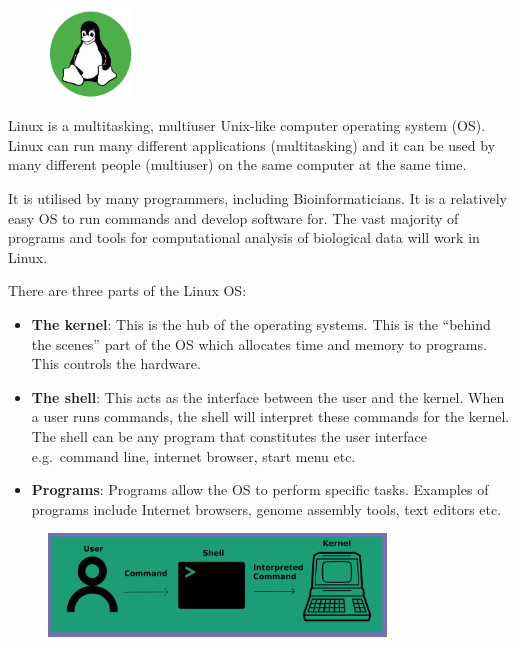 \documentclass[
  letterpaper,
  DIV=11,
  numbers=noendperiod]{scrreprt}
\providecommand{\tightlist}{%
  \setlength{\itemsep}{0pt}\setlength{\parskip}{0pt}}\usepackage{longtable,booktabs,array}
\begin{document}
\begin{figure}

{\centering \includegraphics[width=0.2\textwidth,height=\textheight]{figures/linux_beginner.png}

}

\end{figure}

Linux is a multitasking, multiuser Unix-like computer operating system
(OS). Linux can run many different applications (multitasking) and it
can be used by many different people (multiuser) on the same computer at
the same time.

It is utilised by many programmers, including Bioinformaticians. It is a
relatively easy OS to run commands and develop software for. The vast
majority of programs and tools for computational analysis of biological
data will work in Linux.

There are three parts of the Linux OS:

\begin{itemize}
\tightlist
\item
  \textbf{The kernel}: This is the hub of the operating systems. This is
  the ``behind the scenes'' part of the OS which allocates time and
  memory to programs. This controls the hardware.
\item
  \textbf{The shell}: This acts as the interface between the user and
  the kernel. When a user runs commands, the shell will interpret these
  commands for the kernel. The shell can be any program that constitutes
  the user interface e.g.~command line, internet browser, start menu
  etc.
\item
  \textbf{Programs}: Programs allow the OS to perform specific tasks.
  Examples of programs include Internet browsers, genome assembly tools,
  text editors etc.
\end{itemize}

\begin{figure}

{\centering \includegraphics[width=0.8\textwidth,height=\textheight]{figures/linux_user_to_kernel.png}

}

\end{figure}
\end{document}
